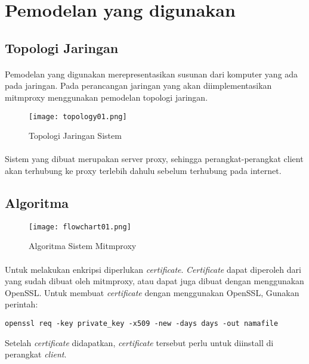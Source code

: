 \documentclass[./bab_3.tex]{subfiles}
\begin{document}
  \section{Pemodelan yang digunakan}
  \subsection{Topologi Jaringan}
  \paragraph*{}Pemodelan yang digunakan merepresentasikan
  susunan dari komputer yang ada pada jaringan. Pada
  perancangan jaringan yang akan diimplementasikan mitmproxy
  menggunakan pemodelan topologi jaringan.

  \begin{figure}[hbt!]
  \centering
    \texttt{[image: topology01.png]}
    \caption{Topologi Jaringan Sistem}
  \end{figure}

  \paragraph*{}Sistem yang dibuat merupakan server proxy, sehingga
  perangkat-perangkat client akan terhubung ke proxy
  terlebih dahulu sebelum terhubung pada internet.

  \subsection{Algoritma}
  \begin{figure}[hbt!]
  \centering
    \texttt{[image: flowchart01.png]}
    \caption{Algoritma Sistem Mitmproxy}
  \end{figure}

  \paragraph*{}Untuk melakukan enkripsi diperlukan
  \textit{certificate}. \textit{Certificate} dapat diperoleh
  dari yang sudah dibuat oleh mitmproxy, atau dapat juga
  dibuat dengan menggunakan OpenSSL. Untuk membuat
  \textit{certificate} dengan menggunakan OpenSSL, Gunakan
  perintah:

  \texttt{openssl req -key private_key -x509 -new -days days -out namafile}

  Setelah \textit{certificate} didapatkan,
  \textit{certificate} tersebut perlu untuk diinstall di
  perangkat \textit{client}.
\end{document}
